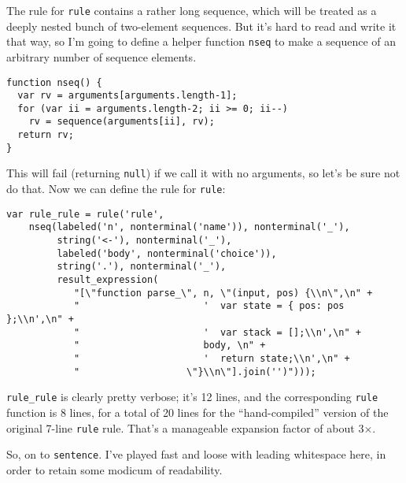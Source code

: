 \documentclass[
]{article}
\begin{document}
The rule for \texttt{rule} contains a rather long sequence, which will
be treated as a deeply nested bunch of two-element sequences. But it's
hard to read and write it that way, so I'm going to define a helper
function \texttt{nseq} to make a sequence of an arbitrary number of
sequence elements.

\begin{verbatim}
function nseq() {
  var rv = arguments[arguments.length-1];
  for (var ii = arguments.length-2; ii >= 0; ii--)
    rv = sequence(arguments[ii], rv);
  return rv;
}
\end{verbatim}

This will fail (returning \texttt{null}) if we call it with no
arguments, so let's be sure not do that. Now we can define the rule for
\texttt{rule}:

\begin{verbatim}
var rule_rule = rule('rule',
    nseq(labeled('n', nonterminal('name')), nonterminal('_'),
         string('<-'), nonterminal('_'),
         labeled('body', nonterminal('choice')), 
         string('.'), nonterminal('_'),
         result_expression(
            "[\"function parse_\", n, \"(input, pos) {\\n\",\n" +
            "                      '  var state = { pos: pos };\\n',\n" +
            "                      '  var stack = [];\\n',\n" +
            "                      body, \n" +
            "                      '  return state;\\n',\n" +
            "                   \"}\\n\"].join('')")));
\end{verbatim}

\texttt{rule\_rule} is clearly pretty verbose; it's 12 lines, and the
corresponding \texttt{rule} function is 8 lines, for a total of 20 lines
for the ``hand-compiled'' version of the original 7-line \texttt{rule}
rule. That's a manageable expansion factor of about 3×.

So, on to \texttt{sentence}. I've played fast and loose with leading
whitespace here, in order to retain some modicum of readability.
\end{document}
